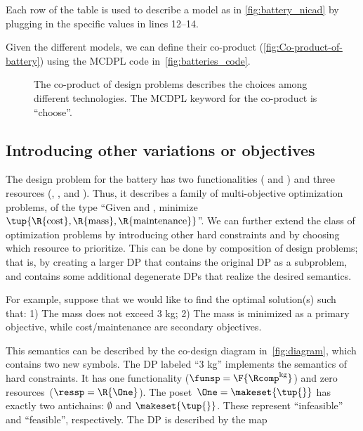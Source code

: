 Each row of the table is used to describe a model as in \cref{fig:battery_nicad} by plugging in the specific values in lines 12--14.

Given the different models, we can define their co-product (\cref{fig:Co-product-of-battery}) using the MCDPL code in~\cref{fig:batteries_code}.

\begin{figure}[h]

    \caption{
        The co-product of design problems describes the choices among different technologies.
        The MCDPL keyword for the co-product is ``choose''.
    }
    \label{fig:batteriesbig}
\end{figure}

\subsection{Introducing other variations or objectives}

The design problem for the battery has two functionalities ( and ) and three resources (, , and ).
Thus, it describes a family of multi-objective optimization problems, of the type ``Given  and , minimize $\tup{ \R{\text{cost}},\R{\text{mass}},\R{\text{maintenance}}} $''.
We can further extend the class of optimization problems by introducing other hard constraints and by choosing which resource to prioritize.
This can be done by composition of design problems; that is, by creating a larger DP that contains the original DP as a subproblem, and contains some additional degenerate DPs that realize the desired semantics.

For example, suppose that we would like to find the optimal solution(s) such that: 1) The mass does not exceed 3 kg; 2) The mass is minimized as a primary objective, while cost/maintenance are secondary objectives.

This semantics can be described by the co-design diagram in~\cref{fig:diagram}, which contains two new symbols.
The DP labeled ``3 kg'' implements the semantics of hard constraints.
It has one functionality ($\funsp=\F{\Rcomp^{\text{kg}}}$) and zero resources~($\ressp=\R{\One}$).
The poset~$\One=\makeset{\tup{ } }$ has exactly two antichains: $\emptyset$ and $\makeset{\tup{ } }$.
These represent ``infeasible'' and ``feasible'', respectively.
The DP is described by the map


